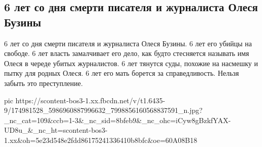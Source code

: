  
 
 
 
 
\subsection{6 лет со дня смерти писателя и журналиста Олеся Бузины}
\label{sec:16_04_2021.fb.zharkih_ekaterina.1.buzina_oles}

6 лет со дня смерти писателя и журналиста Олеся Бузины. 
6 лет его убийцы на свободе. 
6 лет власть замалчивает его дело, как будто стесняется называть имя Олеся в череде убитых журналистов. 
6 лет тянутся суды, похожие на насмешку и пытку для родных Олеся. 
6 лет его мать борется за справедливость. 
Нельзя забыть это преступление.

\ifcmt
  pic https://scontent-bos3-1.xx.fbcdn.net/v/t1.6435-9/174981528_5986960887996632_7998856160568837591_n.jpg?_nc_cat=109&ccb=1-3&_nc_sid=8bfeb9&_nc_ohc=iCyw8gBzkfYAX-UD8u_&_nc_ht=scontent-bos3-1.xx&oh=5e23d548e2fdd86175241336410b8bfc&oe=60A08B18
\fi

